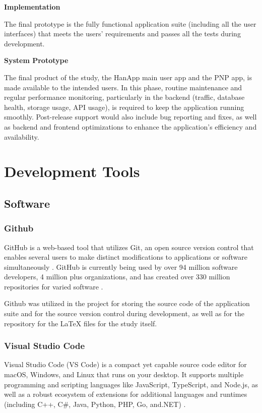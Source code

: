 \textbf{Implementation}

The final prototype is the fully functional application suite (including all the user interfaces) that meets the users’ requirements and passes all the tests during development.

\textbf{System Prototype}

The final product of the study, the HanApp main user app and the PNP app, is made available to the intended users. In this phase, routine maintenance and regular performance monitoring, particularly in the backend (traffic, database health, storage usage, API usage), is required to keep the application running smoothly. Post-release support would also include bug reporting and fixes, as well as backend and frontend optimizations to enhance the application’s efficiency and availability.

\section{Development Tools}
\subsection{Software}

\subsubsection{Github}
GitHub is a web-based tool that utilizes Git, an open source version control that enables several users to make distinct modifications to applications or software simultaneously \cite{digitalGovGitHub}. GitHub is currently being used by over 94 million software developers, 4 million plus organizations, and has created over 330 million repositories for varied software \cite{github}. 

Github was utilized in the project for storing the source code of the application suite and for the source version control during development, as well as for the repository for the LaTeX files for the study itself.

\subsubsection{Visual Studio Code}
Visual Studio Code (VS Code) is a compact yet capable source code editor for macOS, Windows, and Linux that runs on your desktop. It supports multiple programming and scripting languages like JavaScript, TypeScript, and Node.js, as well as a robust ecosystem of extensions for additional languages and runtimes (including C++, C\#, Java, Python, PHP, Go, and.NET) \cite{microsoft_2021}.

